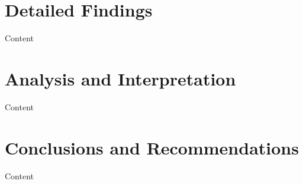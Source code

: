 \documentclass[12pt]{article}
\begin{document}
\section{Detailed Findings}
    Content

\section{Analysis and Interpretation}
    Content

\section{Conclusions and Recommendations}
    Content







\end{document}

